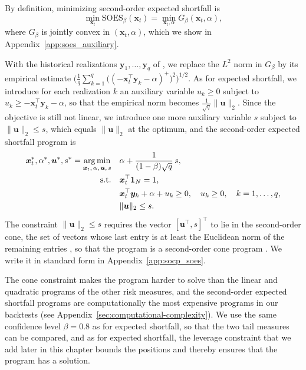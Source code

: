 By definition, minimizing second-order expected shortfall is
\begin{equation*}
    \min_{\bm{x}_t} \text{SOES}_\beta(\bm{x}_t) = \min_{\bm{x}_t, \alpha} G_\beta(\bm{x}_t, \alpha),
\end{equation*}
where $G_\beta$ is jointly convex in $(\bm{x}_t, \alpha)$, which we show in Appendix~\ref{app:soes_auxiliary}.

With the historical realizations $\bm{y}_1, \dots, \bm{y}_q$ of , we replace the $L^2$ norm in
$G_\beta$ by its empirical estimate
$\bigl( \frac{1}{q} \sum_{k=1}^q \bigl( (-\bm{x}_t^\top \bm{y}_k - \alpha)^+ \bigr)^2 \bigr)^{1/2}$. As for expected
shortfall, we introduce for each realization $k$ an auxiliary variable $u_k \ge 0$ subject to
$u_k \ge -\bm{x}_t^\top \bm{y}_k - \alpha$, so that the empirical norm becomes $\frac{1}{\sqrt{q}} \|\bm{u}\|_2$. Since the objective is still not linear, we introduce
one more auxiliary variable $s$ subject to $\|\bm{u}\|_2 \le s$, which equals $\|\bm{u}\|_2$ at the optimum, and the
second-order expected shortfall program is
\begin{equation*}
\begin{aligned}
    \bm{x}_t^*, \alpha^*, \bm{u}^*, s^* = \operatorname*{arg\,min}_{\bm{x}_t,\, \alpha,\, \bm{u},\, s} \quad
    & \alpha + \frac{1}{(1-\beta)\sqrt{q}}\, s, \\
    \text{s.t.} \quad & \bm{x}_t^\top \bm{1}_N = 1, \\
    & \bm{x}_t^\top \bm{y}_k + \alpha + u_k \ge 0, \quad u_k \ge 0, \quad k = 1, \dots, q, \\
    & \|\bm{u}\|_2 \le s.
\end{aligned}
\end{equation*}
The constraint $\|\bm{u}\|_2 \le s$ requires the vector $[\bm{u}^\top, s]^\top$ to lie in the second-order cone, the set
of vectors whose last entry is at least the Euclidean norm of the remaining entries \cite[Section~2.2.3]{boyd2004convex},
so that the program is a second-order cone program \cite[Section~4.4.2]{boyd2004convex}. We write it in standard form in
Appendix~\ref{app:socp_soes}.

The cone constraint makes the program harder to solve than the linear and quadratic programs of the other risk
measures, and the second-order expected shortfall programs are computationally the most expensive programs in our
backtests (see Appendix~\ref{sec:computational-complexity}). We use the same confidence level $\beta = 0.8$ as for expected
shortfall, so that the two tail measures can be compared, and as for expected shortfall, the leverage constraint that we
add later in this chapter bounds the positions and thereby ensures that the program has a solution.

